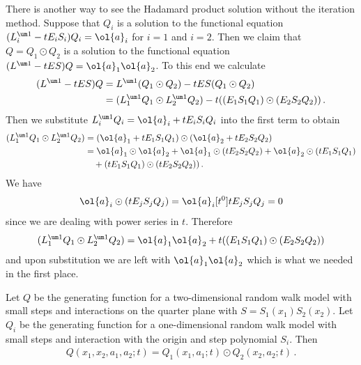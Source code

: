 \begin{example}
There is another way to see the Hadamard product solution without the iteration method. Suppose that $Q_i$ is a solution to the functional equation $(L_i^{\um 1} - tE_iS_i)Q_i = \ol{a}_i$ for $i = 1$ and $i = 2$. Then we claim that $Q = Q_1 \odot Q_2$ is a solution to the functional equation $(L^{\um 1} - tES)Q = \ol{a}_1\ol{a}_2$. To this end we calculate
\begin{align}\begin{split}
	(L^{\um 1}-tES)Q &= L^{\um 1} (Q_1\odot Q_2) - tES(Q_1\odot Q_2)\\
	& = (L^{\um 1}_1Q_1\odot L^{\um 1}_2Q_2) - t((E_1S_1Q_1)\odot (E_2S_2Q_2))\,.
\end{split}\end{align}
Then we substitute $ L^{\um 1}_i Q_i = \ol{a}_i + tE_iS_iQ_i$ into the first term to obtain
\begin{align}\begin{split}
	 (L^{\um 1}_1Q_1\odot L^{\um 1}_2Q_2) &= (\ol{a}_1+ t E_1 S_1 Q_1)\odot(\ol{a}_2 + t E_2 S_2 Q_2)\\
	 & = \ol{a}_1\odot\ol{a}_2 + \ol{a}_1\odot (t E_2 S_2 Q_2) + \ol{a}_2\odot(t E_1 S_1 Q_1) \\
	 &\quad+ (t E_1 S_1 Q_1)\odot(t E_2 S_2 Q_2))\,.
\end{split}\end{align}
We have
\begin{align}
	\ol{a}_i\odot (t E_j S_j Q_j) = \ol{a}_i [t^0]t E_j S_j Q_j = 0
\end{align}
since we are dealing with power series in $t$. Therefore
\begin{align}
	(L^{\um 1}_1Q_1\odot L^{\um 1}_2Q_2) =  \ol{a}_1\ol{a}_2 +t ((E_1 S_1 Q_1)\odot (E_2 S_2 Q_2))
\end{align}
and upon substitution we are left with $\ol{a}_1\ol{a}_2$ which is what we needed in the first place.
\end{example}

\begin{lemma} Let $Q$ be the generating function for a two-dimensional random walk model with small steps and interactions on the quarter plane with $S = S_1(x_1)S_2(x_2)$. Let $Q_i$ be the generating function for a one-dimensional random walk model with small steps and interaction with the origin and step polynomial $S_i$. Then
\begin{align}
	Q(x_1,x_2,a_1,a_2;t) = Q_1(x_1,a_1;t)\odot Q_2(x_2,a_2;t)\,.
\end{align}
\end{lemma}

